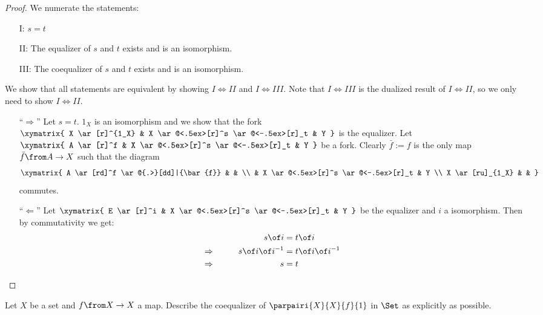 \begin{answer}
  \begin{proof}
    We numerate the statements:
    \begin{itemize}
      \item  [I:]$s=t$
      \item [II:]The equalizer of $s$ and $t$ exists and is an isomorphism.
      \item[III:]The coequalizer of $s$ and $t$ exists and is an isomorphism.
    \end{itemize}
    We show that all statements are equivalent by showing $I \Leftrightarrow II$ and $I \Leftrightarrow III$.
    Note that $I \Leftrightarrow III$ is the dualized result of $I \Leftrightarrow II$, so we only need to show $I \Leftrightarrow II$.

    \begin{itemize}
      \item[``$\Rightarrow$'']
        Let $s=t$. $1_X$ is an isomorphism and we show that the fork
        $\xymatrix{
          X \ar[r]^{1_X} & X \ar@<.5ex>[r]^s \ar@<-.5ex>[r]_t & Y
        }$
        is the equalizer. Let
        $\xymatrix{
          A \ar[r]^f & X \ar@<.5ex>[r]^s \ar@<-.5ex>[r]_t & Y
        }$
        be a fork.
        Clearly $\bar{f} := f$ is the only map $\bar{f} \from A \to X$ such that the diagram
        \[ \xymatrix{
          A \ar[rd]^f \ar@{.>}[dd]|{\bar{f}} & & \\
          & X \ar@<.5ex>[r]^s \ar@<-.5ex>[r]_t & Y \\
          X \ar[ru]_{1_X} & &
        } \]
        commutes.
      \item[``$\Leftarrow$'']
        Let
        $\xymatrix{
          E \ar[r]^i & X \ar@<.5ex>[r]^s \ar@<-.5ex>[r]_t & Y
        }$
        be the equalizer and $i$ a isomorphism. Then by commutativity we get:
        \begin{alignat*}{4}
          && s \of i &= t \of i \\
          \Rightarrow  &\qquad& s \of i \of i^{-1} &= t \of i \of i^{-1} \\
          \Rightarrow  &      & s &= t
        \end{alignat*}\qedhere
    \end{itemize}
  \end{proof}
\end{answer}

\begin{exercise}
  Let $X$ be a set and $f\from X \to X$ a map.  Describe the coequalizer of
  $\parpairi{X}{X}{f}{1}$ in $\Set$ as explicitly as possible.
\end{exercise}

